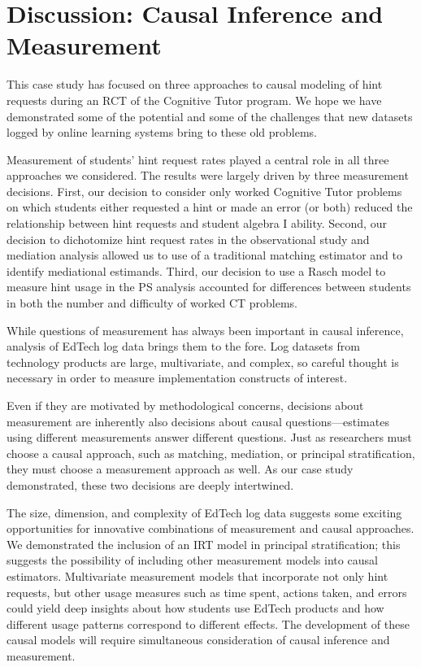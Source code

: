 \documentclass{article}\usepackage[]{graphicx}\usepackage[]{color}
\begin{document}
\section{Discussion: Causal Inference and Measurement}\label{sec:conclusion}
This case study has focused on three approaches to causal modeling of
hint requests during an RCT of the Cognitive Tutor program.
We hope we have demonstrated some of the potential and some of the
challenges that new datasets logged by online
learning systems bring to these old problems.

Measurement of students' hint request rates played a central role in all three approaches we considered.
The results were largely driven by three measurement decisions.
First, our decision to consider only worked Cognitive Tutor problems on which students either requested a hint or made an error (or both) reduced the relationship between hint requests and student algebra I ability.
Second, our decision to dichotomize hint request rates in the observational study and mediation analysis allowed us to use of a traditional matching estimator and to identify mediational estimands.
Third, our decision to use a Rasch model to measure hint usage in the PS analysis accounted for differences between students in both the number and difficulty of worked CT problems.

While questions of measurement has always been important in causal inference, analysis of EdTech log data brings them to the fore.
Log datasets from technology products are large, multivariate, and complex, so careful thought is necessary in order to measure implementation constructs of interest.

Even if they are motivated by methodological concerns, decisions about measurement are inherently also decisions about causal questions---estimates using different measurements answer different questions.
Just as researchers must choose a causal approach, such as matching, mediation, or principal stratification, they must choose a measurement approach as well.
As our case study demonstrated, these two decisions are deeply intertwined.

The size, dimension, and complexity of EdTech log data suggests some exciting opportunities for innovative combinations of measurement and causal approaches.
We demonstrated the inclusion of an IRT model in principal stratification; this suggests the possibility of including other measurement models into causal estimators.
Multivariate measurement models that incorporate not only hint requests, but other usage measures such as time spent, actions taken, and errors could yield deep insights about how students use EdTech products and how different usage patterns correspond to different effects.
The development of these causal models will require simultaneous consideration of causal inference and measurement.
\end{document}
